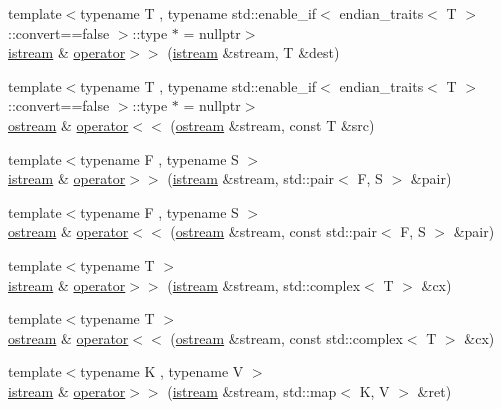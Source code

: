 \begin{DoxyCompactItemize}
\item 
{\footnotesize template$<$typename T , typename std\+::enable\+\_\+if$<$ endian\+\_\+traits$<$ T $>$\+::convert==false $>$\+::type $\ast$  = nullptr$>$ }\\\hyperlink{classmui_1_1istream}{istream} \& \hyperlink{namespacemui_a3b115b75378c546838f2622c86ebb53c}{operator$>$$>$} (\hyperlink{classmui_1_1istream}{istream} \&stream, T \&dest)
\item 
{\footnotesize template$<$typename T , typename std\+::enable\+\_\+if$<$ endian\+\_\+traits$<$ T $>$\+::convert==false $>$\+::type $\ast$  = nullptr$>$ }\\\hyperlink{classmui_1_1ostream}{ostream} \& \hyperlink{namespacemui_ada7c54d117021dc19d88dd3652ec4bb2}{operator$<$$<$} (\hyperlink{classmui_1_1ostream}{ostream} \&stream, const T \&src)
\item 
{\footnotesize template$<$typename F , typename S $>$ }\\\hyperlink{classmui_1_1istream}{istream} \& \hyperlink{namespacemui_a276a62a23127d6c7fbfd6525bca21d22}{operator$>$$>$} (\hyperlink{classmui_1_1istream}{istream} \&stream, std\+::pair$<$ F, S $>$ \&pair)
\item 
{\footnotesize template$<$typename F , typename S $>$ }\\\hyperlink{classmui_1_1ostream}{ostream} \& \hyperlink{namespacemui_aa059f4e5dfbb75a3846533030db8053a}{operator$<$$<$} (\hyperlink{classmui_1_1ostream}{ostream} \&stream, const std\+::pair$<$ F, S $>$ \&pair)
\item 
{\footnotesize template$<$typename T $>$ }\\\hyperlink{classmui_1_1istream}{istream} \& \hyperlink{namespacemui_a95e511efccb2493b9ac59fe7fc2ff7d4}{operator$>$$>$} (\hyperlink{classmui_1_1istream}{istream} \&stream, std\+::complex$<$ T $>$ \&cx)
\item 
{\footnotesize template$<$typename T $>$ }\\\hyperlink{classmui_1_1ostream}{ostream} \& \hyperlink{namespacemui_a12c2d4835c31fb8b30f87b2efe74d347}{operator$<$$<$} (\hyperlink{classmui_1_1ostream}{ostream} \&stream, const std\+::complex$<$ T $>$ \&cx)
\item 
{\footnotesize template$<$typename K , typename V $>$ }\\\hyperlink{classmui_1_1istream}{istream} \& \hyperlink{namespacemui_a13db2bc280275da1dd3451579528983e}{operator$>$$>$} (\hyperlink{classmui_1_1istream}{istream} \&stream, std\+::map$<$ K, V $>$ \&ret)
\item 

\end{DoxyCompactItemize}
